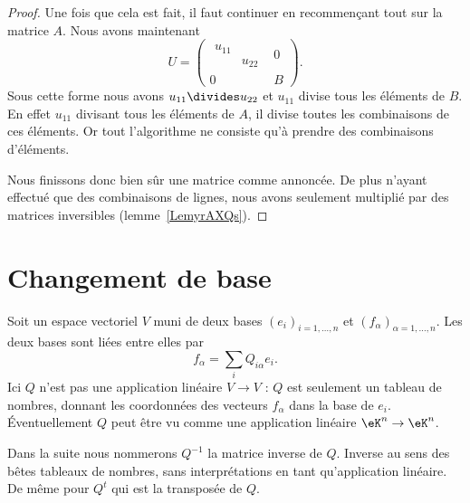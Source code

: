 \begin{proof}
    Une fois que cela est fait, il faut continuer en recommençant tout sur la matrice \( A\). Nous avons maintenant
    \begin{equation}
        U=\begin{pmatrix}
            \begin{matrix}
                u_{11}  &       \\
                &   u_{22}
            \end{matrix}&   0    \\
            0    &   B
        \end{pmatrix}.
    \end{equation}
    Sous cette forme nous avons \( u_{11}\divides u_{22}\) et \( u_{11}\) divise tous les éléments de \( B\). En effet \( u_{11}\) divisant tous les éléments de \( A\), il divise toutes les combinaisons de ces éléments. Or tout l'algorithme ne consiste qu'à prendre des combinaisons d'éléments.

    Nous finissons donc bien sûr une matrice comme annoncée. De plus n'ayant effectué que des combinaisons de lignes, nous avons seulement multiplié par des matrices inversibles (lemme~\ref{LemyrAXQs}).
\end{proof}

\section{Changement de base}

Soit un espace vectoriel \( V\) muni de deux bases \( (e_i)_{i=1,\ldots, n}\) et \( (f_{\alpha})_{\alpha=1,\ldots, n}\). Les deux bases sont liées entre elles par
\begin{equation}        \label{EQooFRQRooSMsQQB}
    f_{\alpha}=\sum_iQ_{i\alpha}e_i.
\end{equation}
Ici \( Q\) n'est pas une application linéaire \( V\to V\) : \( Q\) est seulement un tableau de nombres, donnant les coordonnées des vecteurs \( f_{\alpha}\) dans la base de \( e_i\). Éventuellement \( Q\) peut être vu comme une application linéaire \( \eK^n\to \eK^n\).

Dans la suite nous nommerons \( Q^{-1}\) la matrice inverse de \( Q\). Inverse au sens des bêtes tableaux de nombres, sans interprétations en tant qu'application linéaire. De même pour \( Q^t\) qui est la transposée de \( Q\).

